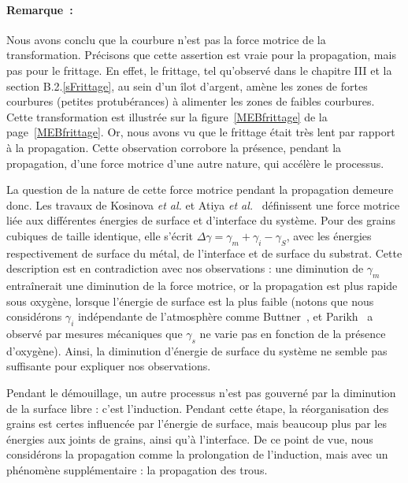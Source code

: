 {{\paragraph*{Remarque~:} Nous avons conclu que la courbure n’est pas la force motrice de la transformation. Précisons que cette assertion est vraie pour la propagation, mais pas pour le frittage. En effet, le frittage, tel qu’observé dans le chapitre III et la section B.2.\ref{sFrittage}, au sein d’un îlot d’argent, amène les zones de fortes courbures (petites protubérances) à alimenter les zones de faibles courbures. Cette transformation est illustrée sur la figure~\ref{MEBfrittage} de la page~\ref{MEBfrittage}. Or, nous avons vu que le frittage était très lent par rapport à la propagation. Cette observation corrobore la présence, pendant la propagation, d’une force motrice d’une autre nature, qui accélère le processus.\par \vspace{12pt}

La question de la nature de cette force motrice pendant la propagation demeure donc. Les travaux de Kosinova \textit{et al.} et Atiya \textit{et al.}~\cite{kosinova2014role, atiya2014role} définissent une force motrice liée aux différentes énergies de surface et d'interface du système. Pour des grains cubiques de taille identique, elle s’écrit $\Delta\gamma = \gamma_m+\gamma_i-\gamma_S$, avec les énergies respectivement de surface du métal, de l’interface et de surface du substrat. Cette description est en contradiction avec nos observations : une diminution de $\gamma_m$ entraînerait une diminution de la force motrice, or la propagation est plus rapide sous oxygène, lorsque l’énergie de surface est la plus faible (notons que nous considérons $\gamma_i$ indépendante de l’atmosphère comme Buttner~\cite{buttner1952adsorption}, et Parikh~\cite{parikh1958effect} a observé par mesures mécaniques que $\gamma_s$ ne varie pas en fonction de la présence d’oxygène). Ainsi, la diminution d’énergie de surface du système ne semble pas suffisante pour expliquer nos observations.\par 
Pendant le démouillage, un autre processus n’est pas gouverné par la diminution de la surface libre : c’est l’induction. Pendant cette étape, la réorganisation des grains est certes influencée par l’énergie de surface, mais beaucoup plus par les énergies aux joints de grains, ainsi qu’à l’interface. De ce point de vue, nous considérons la propagation comme la prolongation de l’induction, mais avec un phénomène supplémentaire : la propagation des trous.\par 
{}

}}

